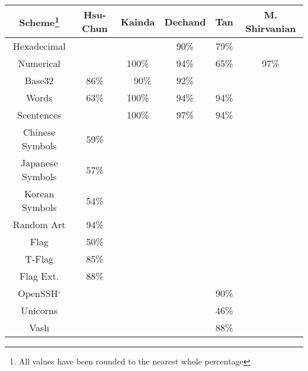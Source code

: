 \begin{tabular}{c|ccccc}
    \toprule
    \textbf{Scheme\footnote{All values have been rounded to the nearest whole percentage}} 
    & Hsu-Chun\cite{hsiao2009study}      
    & Kainda\cite{kainda2009usability}      
    & Dechand\cite{dechand2016empirical}
    & Tan\cite{tan2017can}      
    & M. Shirvanian\cite{shirvanian2017pitfalls}
    \\\hline
    Hexadecimal     &        &        & 90\% & 79\% &            \\
    Numerical       &        & 100\%  & 94\% & 65\% & 97\%       \\
    Base32          & 86\%   & ~~90\% & 92\% &      &            \\
    Words           & 63\%   & 100\%  & 94\% & 94\% &            \\
    Scentences      &        & 100\%  & 97\% & 94\% &            \\
    Chinese Symbols & 59\%   &        &      &      &            \\
    Japanese Symbols& 57\%   &        &      &      &            \\
    Korean Symbols  & 54\%   &        &      &      &            \\
    \midrule
    Random Art	     & 94\%   &&&&\\
    Flag    	     & 50\%   &&&&\\
    T-Flag  	     & 85\%   &&&&\\
    Flag Ext.	     & 88\%   &&&&\\
    OpenSSH`         &&&& 90\% &\\
    Unicorns         &&&& 46\% &\\
    Vash             &&&& 88\% &\\
    \bottomrule
\end{tabular}